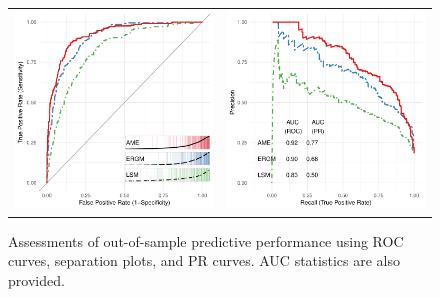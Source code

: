 \begin{figure}[ht]
	\centering
	\caption{Assessments of out-of-sample predictive performance using ROC curves, separation plots, and PR curves. AUC statistics are also provided.}
	\begin{tabular}{cc}
	\includegraphics[width=.5\textwidth]{roc_outSampleSmall} & 
	\includegraphics[width=.5\textwidth]{rocPr_outSampleSmall}	
	\end{tabular}
	\label{fig:roc}
\end{figure}

